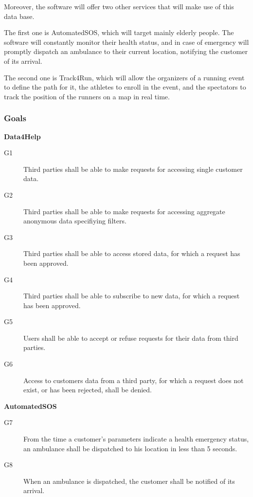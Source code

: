 \documentclass[../main.tex]{subfiles}
\begin{document}
Moreover, the software will offer two other services that will make use of this data base. 

The first one is AutomatedSOS, which will target mainly elderly people. The software will constantly monitor their health status, and in case of emergency will promptly dispatch an ambulance to their current location, notifying the customer of its arrival. 

The second one is Track4Run, which will allow the organizers of a running event to define the path for it, the athletes to enroll in the event, and the spectators to track the position of the runners on a map in real time.

\subsubsection{Goals}

\begin{minipage}{\textwidth}
{\bf Data4Help}
\begin{description}
	\item [G1]  Third parties shall be able to make requests for accessing single customer data.
	\item [G2]  Third parties shall be able to make requests for accessing aggregate anonymous data specifiying filters.
	\item [G3]  Third parties shall be able to access stored data, for which a request has been approved.
	\item [G4]  Third parties shall be able to subscribe to new data, for which a request has been approved.
	\item [G5]  Users shall be able to accept or refuse requests for their data from third parties.
	\item [G6]  Access to customers data from a third party, for which a request does not exist, or has been rejected, shall be denied.
\end{description}
\end{minipage}
\vspace{8mm}

\begin{minipage}{\textwidth}
{\bf AutomatedSOS}
\begin{description}
	\item [G7]  From the time a customer's parameters indicate a health emergency status, an ambulance shall be dispatched to his location in less than 5 seconds.
	\item [G8]  When an ambulance is dispatched, the customer shall be notified of its arrival.
\end{description}
\end{minipage}
\vspace{8mm}
\end{document}
